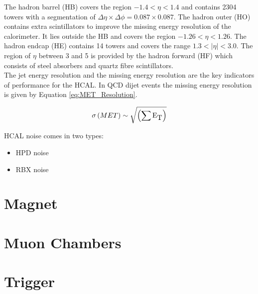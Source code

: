 The hadron barrel (HB) covers the region $-1.4 < \eta < 1.4$ and contains 2304
towers with a segmentation of $\Delta\eta\times\Delta\phi = 0.087\times0.087$.
The hadron outer (HO) contains extra scintillators to improve the missing energy
resolution of the calorimeter. It lies outside the HB and covers the region 
$-1.26 < \eta < 1.26$. The hadron endcap (HE) contains 14 towers and covers the
range $1.3 < |\eta| < 3.0$. The region of $\eta$ between 3 and 5 is provided by
the hadron forward (HF) which consists of steel absorbers and quartz fibre
scintillators. \\

The jet energy resolution and the missing energy resolution are the key
indicators of performance for the HCAL. In QCD dijet events the missing energy
resolution is given by Equation \ref{eq:MET_Resolution}.

\begin{equation}
\sigma\left( MET \right) \sim \sqrt{\left( \sum{\mbox{E}_{\mbox{T}}} \right)}
\label{eq:MET_Resolution}
\end{equation}

HCAL noise comes in two types:

\begin{itemize}
\item HPD noise
\item RBX noise
\end{itemize}

\section{Magnet}



\section{Muon Chambers}

\section{Trigger}
